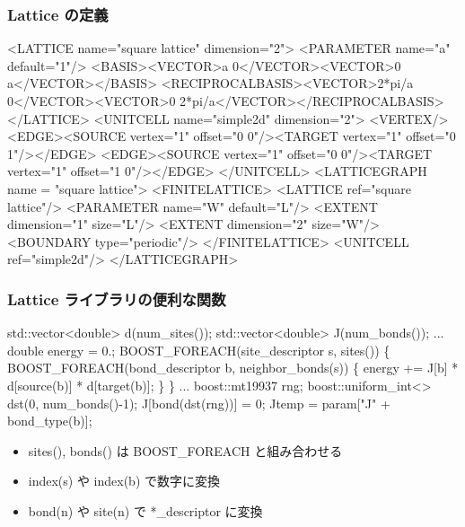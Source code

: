 \begin{frame}[fragile,shrink=30] \frametitle{Lattice の定義}
\begin{semiverbatim}
<LATTICE name="square lattice" dimension="2">
  <PARAMETER name="a" default="1"/>
  <BASIS><VECTOR>a 0</VECTOR><VECTOR>0 a</VECTOR></BASIS>
  <RECIPROCALBASIS><VECTOR>2*pi/a 0</VECTOR><VECTOR>0 2*pi/a</VECTOR></RECIPROCALBASIS>
</LATTICE>
<UNITCELL name="simple2d" dimension="2">
  <VERTEX/>
  <EDGE><SOURCE vertex="1" offset="0 0"/><TARGET vertex="1" offset="0 1"/></EDGE>
  <EDGE><SOURCE vertex="1" offset="0 0"/><TARGET vertex="1" offset="1 0"/></EDGE>
</UNITCELL>
<LATTICEGRAPH name = "square lattice">
  <FINITELATTICE>
    <LATTICE ref="square lattice"/>
    <PARAMETER name="W" default="L"/>
    <EXTENT dimension="1" size="L"/>
    <EXTENT dimension="2" size="W"/>
    <BOUNDARY type="periodic"/>
  </FINITELATTICE>
  <UNITCELL ref="simple2d"/>
</LATTICEGRAPH>
\end{semiverbatim}
\end{frame}

\begin{frame}[fragile,shrink=10] \frametitle{Lattice ライブラリの便利な関数}
\begin{semiverbatim}
std::vector<double> d(\alert{num_sites()});
std::vector<double> J(\alert{num_bonds()});
...
double energy = 0.;
BOOST\_FOREACH(site_descriptor s, \alert{sites()}) \{
  BOOST\_FOREACH(bond_descriptor b, \alert{neighbor_bonds(s)}) \{
    energy += J[b] * d[\alert{source(b)}] * d[\alert{target(b)}];
  \}
\}
...
boost::mt19937 rng;
boost::uniform_int<> dst(0, \alert{num_bonds()}-1);
J[\alert{bond(dst(rng))}] = 0;
Jtemp = param["J" + \alert{bond_type(b)}];
\end{semiverbatim}
  \begin{itemize}
  \item sites(), bonds() は BOOST\_FOREACH と組み合わせる
  \item index(s) や index(b) で数字に変換
  \item bond(n) や site(n) で *\_descriptor に変換
  \end{itemize}
\end{frame}

